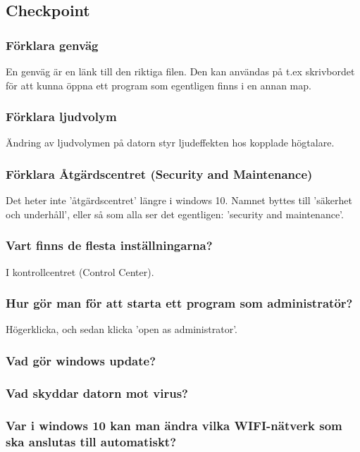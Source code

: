 \subsection{Checkpoint}

\subsubsection{Förklara genväg}
En genväg är en länk till den riktiga filen. Den kan användas på t.ex skrivbordet för att kunna öppna ett program som egentligen finns i en annan map.

\subsubsection{Förklara ljudvolym}
Ändring av ljudvolymen på datorn styr ljudeffekten hos kopplade högtalare.

\subsubsection{Förklara Åtgärdscentret (Security and Maintenance)}
Det heter inte 'åtgärdscentret' längre i windows 10. Namnet byttes till 'säkerhet och underhåll', eller så som alla ser det egentligen: 'security and maintenance'. %

\subsubsection{Vart finns de flesta inställningarna?}
I kontrollcentret (Control Center).

\subsubsection{Hur gör man för att starta ett program som administratör?}
Högerklicka, och sedan klicka 'open as administrator'.

\subsubsection{Vad gör windows update?}

\subsubsection{Vad skyddar datorn mot virus?}

\subsubsection{Var i windows 10 kan man ändra vilka WIFI-nätverk som ska anslutas till automatiskt?}

